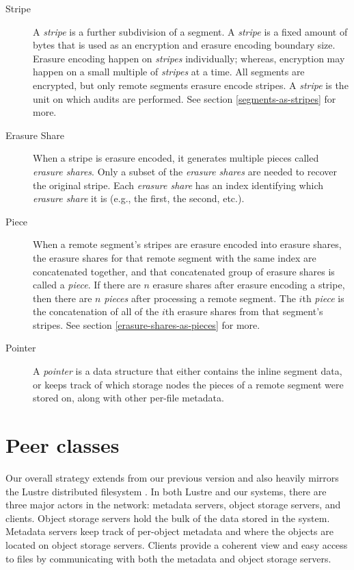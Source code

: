 \documentclass[8pt,fleqn,openany]{book}
\begin{document}
\begin{description}
\item[Stripe] A {\em stripe} is a further subdivision of a segment. A
{\em stripe} is a fixed amount of bytes that is used as an encryption and erasure
encoding boundary size. Erasure encoding happen on {\em stripes} individually;
whereas, encryption may happen on a small multiple of {\em stripes} at a time.
All segments are encrypted, but only remote segments erasure encode stripes.
A {\em stripe} is the unit on which audits are performed.
See section \ref{segments-as-stripes} for more.

\item[Erasure Share] When a stripe is erasure encoded, it generates
multiple pieces called {\em erasure shares}. Only a subset of the {\em erasure
shares} are needed to recover the original stripe. Each {\em erasure
share} has an index identifying which {\em erasure share} it is (e.g., the first,
the second, etc.).

\item[Piece] When a remote segment's stripes are erasure encoded into
erasure shares, the erasure shares for that remote segment with the
same index are concatenated together, and that concatenated group of erasure
shares is called a {\em piece}. If there are $n$ erasure shares after erasure
encoding a stripe, then there are $n$ {\em pieces} after processing a remote
segment. The $i$th {\em piece} is the concatenation of all of the $i$th
erasure shares from that segment's stripes.
See section \ref{erasure-shares-as-pieces} for more.

\item[Pointer] A {\em pointer} is a data structure that either contains the
inline segment data, or keeps track of which
storage nodes the pieces of a remote segment were stored on, along with other
per-file metadata.

\end{description}

\section{Peer classes}

Our overall strategy extends from our previous version \cite{storj-v2} and
also heavily mirrors the Lustre distributed filesystem \cite{lustre}. In
both Lustre and our systems, there are three major actors in the network:
metadata servers, object storage servers, and clients. Object
storage servers hold the bulk of the data stored in the system. Metadata
servers keep track of per-object metadata and where the objects are located
on object storage servers. Clients provide a coherent view and easy access
to files by communicating with both the metadata and object storage servers.
\end{document}
